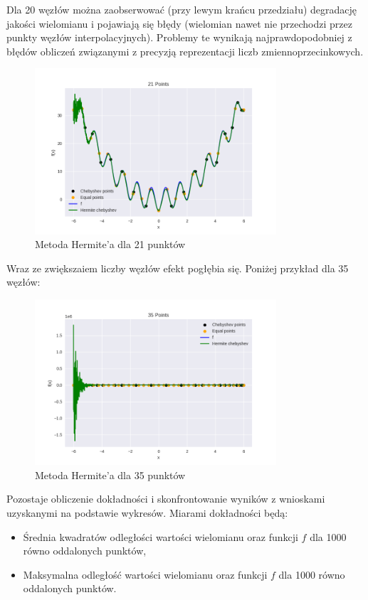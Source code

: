 \documentclass{article}
\begin{document}
Dla 20 węzłów można zaobserwować (przy lewym krańcu przedziału) degradację jakości wielomianu i pojawiają się błędy (wielomian nawet
nie przechodzi przez punkty węzłów interpolacyjnych). Problemy te wynikają najprawdopodobniej z błędów obliczeń związanymi z precyzją
reprezentacji liczb zmiennoprzecinkowych.

\begin{figure}[H]
    \centering
    \includegraphics[width=0.8\textwidth]{img/herm_21.png}
    \caption{Metoda Hermite'a dla 21 punktów}
\end{figure}

Wraz ze zwiększaiem liczby węzłów efekt pogłębia się. Poniżej przykład dla 35 węzłów:

\begin{figure}[H]
    \centering
    \includegraphics[width=0.8\textwidth]{img/herm_35.png}
    \caption{Metoda Hermite'a dla 35 punktów}
\end{figure}

\newpage
Pozostaje obliczenie dokładności i skonfrontowanie wyników z wnioskami uzyskanymi na podstawie wykresów. Miarami dokładności będą:
\begin{itemize}
    \item
    Średnia kwadratów odległości wartości wielomianu oraz funkcji $f$ dla 1000 równo oddalonych punktów,
    \item
    Maksymalna odległość wartości wielomianu oraz funkcji $f$ dla 1000 równo oddalonych punktów.
\end{itemize}
\end{document}
